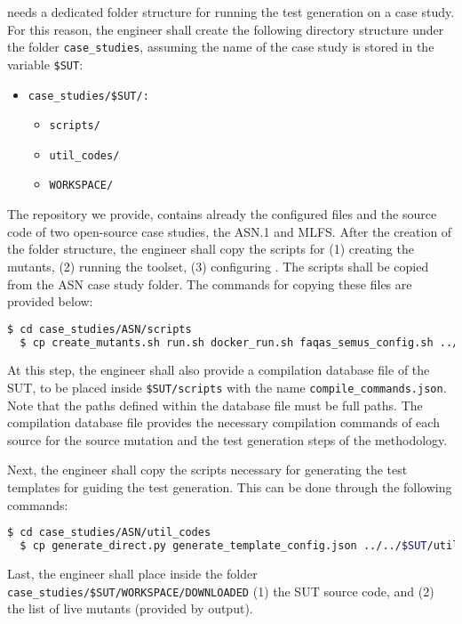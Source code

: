 \SEMUS needs a dedicated folder structure for running the test generation on a case study. 
For this reason, the engineer shall create the following directory structure under the folder \texttt{case\_studies}, assuming the name of the case study is stored in the variable \texttt{\$SUT}:

\begin{itemize}
	\item \texttt{case\_studies/\$SUT/:}
	\begin{itemize}
		\item \texttt{scripts/}
		\item \texttt{util\_codes/}
		\item \texttt{WORKSPACE/}
	\end{itemize}
\end{itemize}

The \SEMUS repository we provide, contains already the configured files and the source code of two open-source case studies, the ASN.1 and MLFS.
After the creation of the folder structure, the engineer shall copy the scripts for (1) creating the mutants, (2) running the toolset, (3) configuring \SEMUS. The scripts shall be copied from the ASN case study folder. The commands for copying these files are provided below:

\begin{lstlisting}[language=bash]
  $ cd case_studies/ASN/scripts
  $ cp create_mutants.sh run.sh docker_run.sh faqas_semus_config.sh ../../$SUT/scripts
\end{lstlisting}

At this step, the engineer shall also provide a compilation database file of the SUT, to be placed inside \texttt{\$SUT/scripts} with the name \texttt{compile\_commands.json}. Note that the paths defined within the database file must be full paths. The compilation database file provides the necessary compilation commands of each source for the source mutation and the test generation steps of the methodology.

Next, the engineer shall copy the scripts necessary for generating the test templates for guiding the test generation. This can be done through the following commands:

\begin{lstlisting}[language=bash]
  $ cd case_studies/ASN/util_codes
  $ cp generate_direct.py generate_template_config.json ../../$SUT/util_codes
\end{lstlisting}

Last, the engineer shall place inside the folder \texttt{case\_studies/\$SUT/WORKSPACE/DOWNLOADED} (1) the SUT source code, and (2) the list of live mutants (provided by \MASS output).

